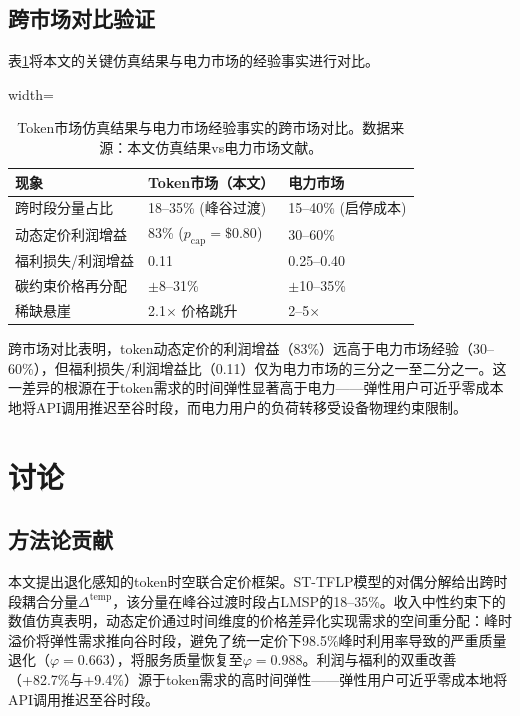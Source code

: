 \documentclass[11pt,a4paper,twocolumn]{article}
\begin{document}
\subsection{跨市场对比验证}

表\ref{tab:cross_validation}将本文的关键仿真结果与电力市场的经验事实进行对比。

\begin{table}[htbp]
\centering
\caption{Token市场仿真结果与电力市场经验事实的跨市场对比。数据来源：本文仿真结果vs电力市场文献。}
\label{tab:cross_validation}
\scriptsize
\begin{adjustbox}{width=\columnwidth}
\begin{tabular}{p{2.2cm}p{2.2cm}p{2.2cm}}
\toprule
\textbf{现象} & \textbf{Token市场（本文）} & \textbf{电力市场} \\
\midrule
跨时段分量占比 & 18--35\% (峰谷过渡) & 15--40\% (启停成本) \cite{stofft2002power} \\
动态定价利润增益 & 83\% ($p_{\text{cap}}=\$0.80$) & 30--60\% \cite{du2021approximating} \\
福利损失/利润增益 & 0.11 & 0.25--0.40 \cite{brenner2026spatial} \\
碳约束价格再分配 & $\pm$8--31\% & $\pm$10--35\% \cite{wan2025grid} \\
稀缺悬崖 & 2.1$\times$ 价格跳升 & 2--5$\times$ \cite{liu2026locational} \\
\bottomrule
\end{tabular}
\end{adjustbox}
\end{table}

跨市场对比表明，token动态定价的利润增益（83\%）远高于电力市场经验（30--60\%），但福利损失/利润增益比（0.11）仅为电力市场的三分之一至二分之一。这一差异的根源在于token需求的时间弹性显著高于电力——弹性用户可近乎零成本地将API调用推迟至谷时段，而电力用户的负荷转移受设备物理约束限制。

\section{讨论}

\subsection{方法论贡献}

本文提出退化感知的token时空联合定价框架。ST-TFLP模型的对偶分解给出跨时段耦合分量$\Delta^{\text{temp}}$，该分量在峰谷过渡时段占LMSP的18--35\%。收入中性约束下的数值仿真表明，动态定价通过时间维度的价格差异化实现需求的空间重分配：峰时溢价将弹性需求推向谷时段，避免了统一定价下98.5\%峰时利用率导致的严重质量退化（$\varphi=0.663$），将服务质量恢复至$\varphi=0.988$。利润与福利的双重改善（+82.7\%与+9.4\%）源于token需求的高时间弹性——弹性用户可近乎零成本地将API调用推迟至谷时段。
\end{document}
